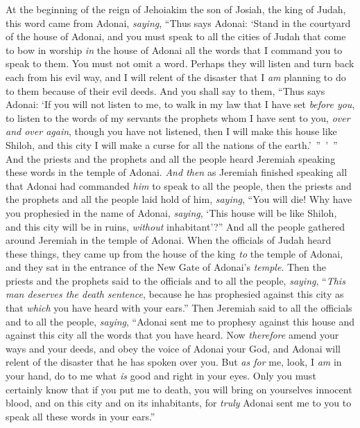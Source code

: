 \begin{biblechapter} %
 At the beginning of the reign of Jehoiakim the son of Josiah, the king of Judah, this word came from Adonai, \textit{saying},
\verse “Thus says Adonai: ‘Stand in the courtyard of the house of Adonai, and you must speak to all the cities of Judah that come to bow in worship \textit{in} the house of Adonai all the words that I command you to speak to them. You must not omit a word.
\verse Perhaps they will listen and turn back each from his evil way, and I will relent of the disaster that I \textit{am} planning to do to them because of their evil deeds.
\verse And you shall say to them, “Thus says Adonai: ‘If you will not listen to me, to walk in my law that I have set \textit{before you},
\verse to listen to the words of my servants the prophets whom I have sent to you, \textit{over and over again}, though you have not listened,
\verse then I will make this house like Shiloh, and this city I will make a curse for all the nations of the earth.’ ” ’ ”
\verse And the priests and the prophets and all the people heard Jeremiah speaking these words in the temple of Adonai.
\verse \textit{And then} as Jeremiah finished speaking all that Adonai had commanded \textit{him} to speak to all the people, then the priests and the prophets and all the people laid hold of him, \textit{saying}, “You will die!
\verse Why have you prophesied in the name of Adonai, \textit{saying}, ‘This house will be like Shiloh, and this city will be in ruins, \textit{without} inhabitant’?” And all the people gathered around Jeremiah in the temple of Adonai.
\verse When the officials of Judah heard these things, they came up from the house of the king \textit{to} the temple of Adonai, and they sat in the entrance of the New Gate of Adonai’s \textit{temple}.
\verse Then the priests and the prophets said to the officials and to all the people, \textit{saying}, “\textit{This man deserves the death sentence}, because he has prophesied against this city as that \textit{which} you have heard with your ears.”
\verse Then Jeremiah said to all the officials and to all the people, \textit{saying}, “Adonai sent me to prophesy against this house and against this city all the words that you have heard.
\verse Now \textit{therefore} amend your ways and your deeds, and obey the voice of Adonai your God, and Adonai will relent of the disaster that he has spoken over you.
\verse But \textit{as for} me, look, I \textit{am} in your hand, do to me what \textit{is} good and right in your eyes.
\verse Only you must certainly know that if you put me to death, you will bring on yourselves innocent blood, and on this city and on its inhabitants, for \textit{truly} Adonai sent me to you to speak all these words in your ears.”

\end{biblechapter}
